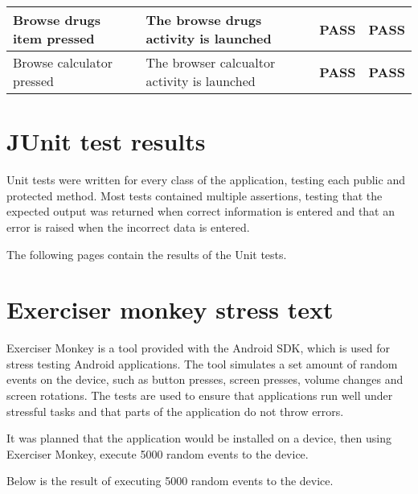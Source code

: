 \documentclass[11pt,fleqn,twoside]{article}
\begin{document}
\begin{center}
\begin{longtable}{| p{5cm} | p{5cm} | c | c |}
Browse drugs item pressed                                                  & The browse drugs activity is launched                                                            & \textbf{PASS}         & \textbf{PASS}          \\ \hline
Browse calculator pressed                                                  & The browser calcualtor activity is launched                                                      & \textbf{PASS}         & \textbf{PASS}          \\ \hline
\end{longtable}
\end{center}

\section{JUnit test results}
Unit tests were written for every class of the application, testing each public and protected method. Most tests contained multiple assertions, testing that the expected output was returned when correct information is entered and that an error is raised when the incorrect data is entered.

The following pages contain the results of the Unit tests.

 

\section{Exerciser monkey stress text}
Exerciser Monkey is a tool provided with the Android SDK, which is used for stress testing Android applications. The tool simulates a set amount of random events on the device, such as button presses, screen presses, volume changes and screen rotations. The tests are used to ensure that applications run well under stressful tasks and that parts of the application do not throw errors.

It was planned that the application would be installed on a device, then using Exerciser Monkey, execute 5000 random events to the device.

Below is the result of executing 5000 random events to the device.
\end{document}
